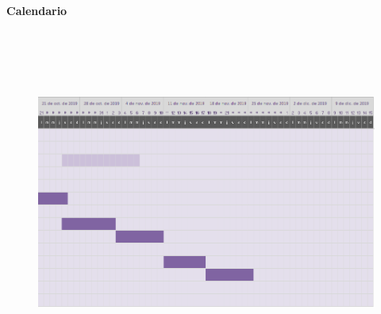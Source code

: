 \documentclass[12pt]{article}
\begin{document}

\par


\vspace{\baselineskip}
\textbf{Calendario }\par




\begin{figure}[H]
	\begin{Center}
		\includegraphics[width=7.18in,height=4.52in]{./media/image3.png}
	\end{Center}
\end{figure}



\par


\vspace{\baselineskip}

\vspace{\baselineskip}

\vspace{\baselineskip}

\vspace{\baselineskip}

\vspace{\baselineskip}
\end{document}
